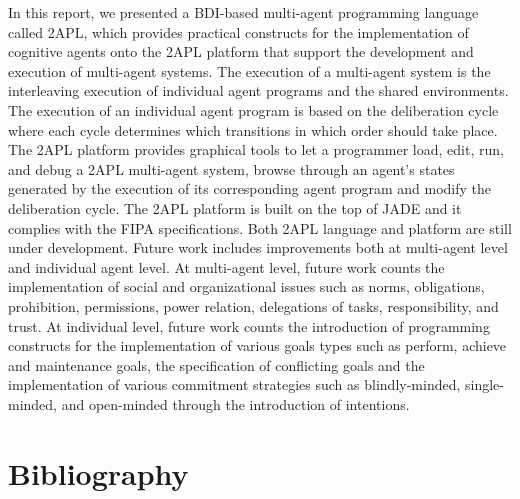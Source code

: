 \documentclass[a4paper]{article}
\begin{document}
In this report, we presented a BDI-based multi-agent programming language called 2APL, which provides practical constructs for the implementation of cognitive agents onto the 2APL platform that support the development and execution of multi-agent systems. The execution of a multi-agent system is the interleaving execution of individual agent programs and the shared environments. The execution of an individual agent program is based on the deliberation cycle where each cycle determines which transitions in which order should take place. The 2APL platform provides graphical tools to let a programmer load, edit, run, and debug a 2APL multi-agent system, browse through an agent’s states generated by the execution of its corresponding agent program and modify the deliberation cycle. The 2APL platform is built on the top of JADE and it complies with the FIPA specifications. Both 2APL language and platform are still under development. Future work includes improvements both at multi-agent level and individual agent level. At multi-agent level, future work counts the implementation of social and organizational issues such as norms, obligations, prohibition, permissions, power relation, delegations of tasks, responsibility, and trust. At individual level, future work counts the introduction of programming constructs  for the implementation of various goals types such as perform, achieve and maintenance goals, the specification of conflicting goals and the implementation of various commitment strategies such as blindly-minded, single-minded, and open-minded through the introduction of intentions.


\section{Bibliography}
\nocite{*}


\end{document}
